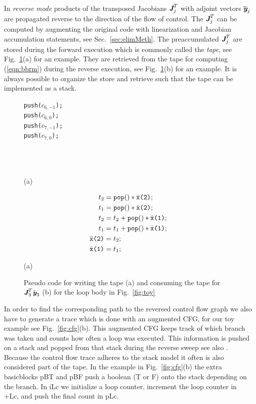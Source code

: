 \documentclass{book}
\newcommand{\basicblock}{basicblock}
\newcommand{\bmJ}{\mbox{\bf\em J}}
\newcommand{\bmy}{\mbox{\bf\em y}}
\newcommand{\code}[1]{{\small\tt{#1}}}
\newcommand{\refsec}[1]{{Sec.~\ref{#1}}}
\newcommand{\reffig}[1]{{Fig.~\ref{#1}}}
\newcommand{\refeqn}[1]{{(\ref{#1})}}
\begin{document}
In {\em reverse mode} products of the transposed
Jacobians $\bmJ^T_j$ with adjoint vectors $\overline{\bmy}_j$
are propagated reverse to the direction of the flow of control.
The $\bmJ^T_j$ can be computed by augmenting the original code with 
linearization and Jacobian accumulation statements, see \refsec{sec:elimMeth}.
The preaccumulated  $\bmJ^T_j$ are stored during the forward execution
which is commonly called the {\em tape}, see \reffig{fig:toyPreaccRev}(a) for an 
example. They are retrieved from the 
tape for computing \refeqn{eqn:bbrm} during the reverse execution, see \reffig{fig:toyPreaccRev}(b) for 
an example. 
It is always possible to organize the store and retrieve such that the tape can be 
implemented as a stack.
\begin{figure}[h]
  \begin{center}
    \begin{minipage}[b]{.2\linewidth}
      \code{push(}$c_{6,-1}$\code{);}\\
      \code{push(}$c_{6,0}$\code{);}\\
      \code{push(}$c_{7,-1}$\code{);}\\
      \code{push(}$c_{7,0}$\code{);}\\
      \\ \\ \\
      \centerline{(a)}
    \end{minipage}
    \begin{minipage}[b]{.2\linewidth}
      \small
      \begin{align*}
        t_2&=\code{pop()}*\bar{\tt x}\mbox{\tt (2)};\\
        t_1&=\code{pop()}*\bar{\tt x}\mbox{\tt (2)};\\
        t_2&=t_2+\code{pop()}*\bar{\tt x}\mbox{\tt (1)};\\
        t_1&=t_1+\code{pop()}*\bar{\tt x}\mbox{\tt (1)};\\
        \bar{\tt x}\mbox{\tt (2)}& =t_2;\\
        \bar{\tt x}\mbox{\tt (1)}& =t_1;
      \end{align*}
      \centerline{(a)}
    \end{minipage}
  \end{center}	
  \caption{Pseudo code for writing the tape (a) and consuming the tape for  $\bmJ_3^T\bar{\bmy}_3$ (b) for  the loop body in \reffig{fig:toy}}\label{fig:toyPreaccRev}
\end{figure}

In order to find the corresponding path to the reversed control flow graph 
we also have to generate a trace which is done with an augmented CFG,
for our toy example see \reffig{fig:cfg}(b).
This augmented CFG  keeps track of which branch was taken and counts how 
often a loop was 
executed.  
This information is pushed on  a stack and popped from that stack during the 
reverse sweep see also \cite{NULF04CFR}. Because the control flow trace 
adheres to the stack model it often is also considered part of the tape. 
In the example in \reffig{fig:cfg}(b) the extra {\basicblock}s pBT and pBF push 
a boolean (T or F) onto the stack depending on the branch. 
In iLc we initialize a loop counter, increment the loop counter in +Lc, 
and push the final count in pLc. 
\end{document}
